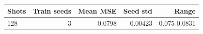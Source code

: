\begin{tabular}{lrrrr}
\toprule
Shots & Train seeds & Mean MSE & Seed std & Range \\
\midrule
128 & 3 & 0.0798 & 0.00423 & 0.075-0.0831 \\
\bottomrule
\end{tabular}
